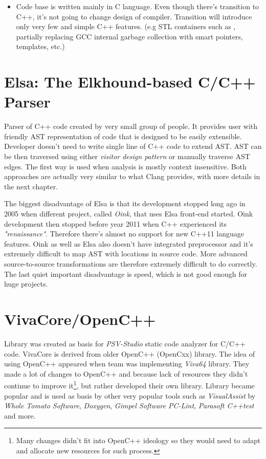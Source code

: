 \begin{itemize}
\item Code base is written mainly in C language. Even though there's transition to C++, it's not going to change design of compiler. Transition will introduce only very few and simple C++ features. (e.g STL containers such as , partially replacing GCC internal garbage collection with smart pointers, templates, etc.)
\end{itemize}

\section{Elsa: The Elkhound-based C/C++ Parser}
Parser of C++ code created by very small group of people. It provides user with friendly AST representation of code that is designed to be easily extensible. Developer doesn't need to write single line of C++ code to extend AST. AST can be then traversed using either \emph{visitor design pattern} or manually traverse AST edges. The first way is used when analysis is mostly context insensitive. Both approaches are actually very similar to what Clang provides, with more details in the next chapter.

The biggest disadvantage of Elsa is that its development stopped long ago in 2005 when different project, called \emph{Oink}, that uses Elsa front-end started. Oink development then stopped before year 2011 when C++ experienced its \textit{"renaissance"}. Therefore there's almost no support for new C++11 language features. Oink as well as Elsa also doesn't have integrated preprocessor and it's extremely difficult to map AST with locations in source code. More advanced source-to-source transformations are therefore extremely difficult to do correctly. The last quiet important disadvantage is speed, which is not good enough for huge projects.

\section{VivaCore/OpenC++}
Library was created as basis for \emph{PSV-Studio} static code analyzer for C/C++ code. VivaCore is derived from older OpenC++ (OpenCxx) library. The idea of using OpenC++ appeared when team was implementing \emph{Viva64} library. They made a lot of changes to OpenC++ and because lack of resources they didn't continue to improve it\footnote{Many changes didn't fit into OpenC++ ideology so they would need to adapt and allocate new resources for such process.}, but rather developed their own library. Library became popular and is used as basis by other very popular tools such as  \emph{VisualAssist} by \emph{Whole Tomato Software}, \emph{Doxygen}, \emph{Gimpel Software PC-Lint}, \emph{Parasoft C++test} and more.

